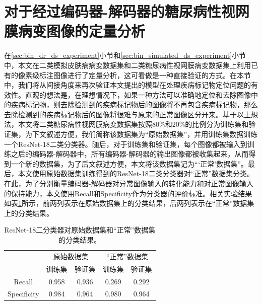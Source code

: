 \section{对于经过编码器-解码器的糖尿病性视网膜病变图像的定量分析}\label{sec:indirect_quantitative_evaluation}
在\ref{sec:bin_dr_ds_experiment}小节和\ref{sec:bin_simulated_ds_experiment}小节中，本文在二类模拟皮肤病病变数据集和二类糖尿病性视网膜病变数据集上利用已有的像素级标注图像进行了定量分析，这可看做是一种直接验证的方式。在本节中，我们将从间接角度来再次验证本文提出的模型在处理疾病标记物定位问题的有效性。直观的想法是，在理想情况下，如果一种方法可以准确地定位和去除图像中的疾病标记物，则去除检测到的疾病标记物后的图像将不再包含疾病标记物，那么去除检测到的疾病标记物后的图像将很难与原来的正常图像区分开来。基于以上想法，本文将二类糖尿病性视网膜病变数据集按照80\%和20\%的比例分为训练集和验证集，为下文叙述方便，我们简称该数据集为“原始数据集”，并用训练集数据训练一个ResNet-18二类分类器。随后，对于训练集和验证集，每个图像都被输入到训练之后的编码器-解码器中，所有编码器-解码器的输出图像都被收集起来，从而得到一个新的数据集，为了后文叙述方便，本文将该数据集记为“‘正常’数据集”。最后，本文使用原始数据集训练得到的ResNet-18二类分类器对“正常”数据集分类。在此，为了分别衡量编码器-解码器对异常图像输入的转化能力和对正常图像输入的保持能力，本文使用Recall和Specificity作为分类器的评价标准。相关实验结果如表\ref{tab:quantitative_retinal}所示，前两列表示在原始数据集上的分类结果，后两列表示在“正常”数据集上的分类结果。
\begin{table}[h!]
	\begin{center}
		\caption[ResNet-18二分类器对原始数据集和“正常”数据集分类结果]{ResNet-18二分类器对原始数据集和“正常”数据集的分类结果。} 
		\label{tab:quantitative_retinal}
		\begin{tabular}{c|cc|cc}
			\toprule[2pt]
			& \multicolumn{2}{c|}{原始数据集} & \multicolumn{2}{c}{“正常”数据集} \\
			&  训练集 & 验证集 & 训练集 & 验证集\\
			\midrule[2pt]
			Recall & 0.958 & 0.936 & 0.269 & 0.292\\ \hline
			Specificity & 0.984 & 0.964 & 0.980 & 0.964\\
			\bottomrule[2pt]
		\end{tabular} 
	\end{center}
\end{table}

